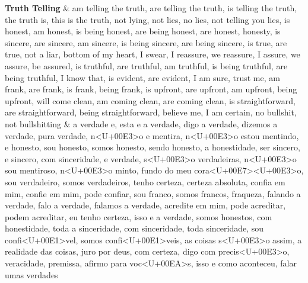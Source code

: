 \documentclass[
  12pt,
]{article}
\begin{document}
\begin{landscape}
\begin{longtabu}
\endfoot
\bottomrule
\endlastfoot
\textbf{Truth Telling} & am telling the truth, are telling the truth, is telling the truth, the truth is, this is the truth, not lying, not lies, no lies, not telling you lies, is honest, am honest, is being honest, are being honest, are honest, honesty, is sincere, are sincere, am sincere, is being sincere, are being sincere, is true, are true, not a liar, bottom of my heart, I swear, I reassure, we reassure, I assure, we assure, be assured, is truthful, are truthful, am truthful, is being truthful, are being truthful, I know that, is evident, are evident, I am sure, trust me, am frank, are frank, is frank, being frank, is upfront, are upfront, am upfront, being upfront, will come clean, am coming clean, are coming clean, is straightforward, are straightforward, being straightforward, believe me, I am certain, no bullshit, not bullshitting & a verdade e, esta e a verdade, digo a verdade, dizemos a verdade, pura verdade, n<U+00E3>o e mentira, n<U+00E3>o estou mentindo, e honesto, sou honesto, somos honesto, sendo honesto, a honestidade, ser sincero, e sincero, com sinceridade, e verdade, s<U+00E3>o verdadeiras, n<U+00E3>o sou mentiroso, n<U+00E3>o minto, fundo do meu cora<U+00E7><U+00E3>o, sou verdadeiro, somos verdadeiros, tenho certeza, certeza absoluta, confia em mim, confie em mim, pode confiar, sou franco, somos francos, fraqueza, falando a verdade, falo a verdade, falamos a verdade, acredite em mim, pode acreditar, podem acreditar, eu tenho certeza, isso e a verdade, somos honestos, com honestidade, toda a sinceridade, com sinceridade, toda sinceridade, sou confi<U+00E1>vel, somos confi<U+00E1>veis, as coisas s<U+00E3>o assim, a realidade das coisas, juro por deus, com certeza, digo com precis<U+00E3>o, veracidade, premissa, afirmo para voc<U+00EA>s, isso e como aconteceu, falar umas verdades\\

\end{longtabu}
\end{landscape}
\end{document}
